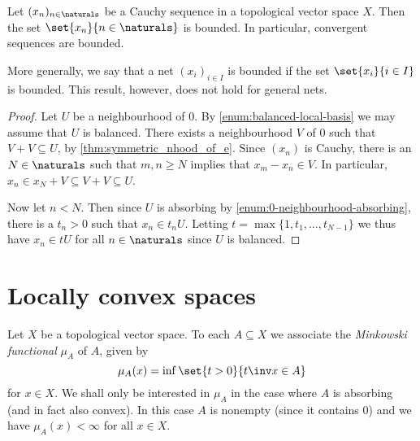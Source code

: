 \documentclass[article, a4paper, 11pt, oneside]{memoir}
\numberwithin{equation}{chapter}
\begin{document}
\begin{corollary}
    \label{thm:Cauchy-sequence-bounded}
    Let $(x_n)_{n \in \naturals}$ be a Cauchy sequence in a topological vector space $X$. Then the set $\set{x_n}{n \in \naturals}$ is bounded. In particular, convergent sequences are bounded.
\end{corollary}
%
More generally, we say that a net $(x_i)_{i \in I}$ is bounded if the set $\set{x_i}{i \in I}$ is bounded. This result, however, does not hold for general nets.

\begin{proof}
    Let $U$ be a neighbourhood of $0$. By \cref{enum:balanced-local-basis} we may assume that $U$ is balanced. There exists a neighbourhood $V$ of $0$ such that $V + V \subseteq U$, by \cref{thm:symmetric_nhood_of_e}. Since $(x_n)$ is Cauchy, there is an $N \in \naturals$ such that $m,n \geq N$ implies that $x_m - x_n \in V$. In particular, $x_n \in x_N + V \subseteq V + V \subseteq U$.

    Now let $n < N$. Then since $U$ is absorbing by \cref{enum:0-neighbourhood-absorbing}, there is a $t_n > 0$ such that $x_n \in t_n U$. Letting $t = \max\{1, t_1, \ldots, t_{N-1}\}$ we thus have $x_n \in tU$ for all $n \in \naturals$ since $U$ is balanced.
\end{proof}


\section{Locally convex spaces}

Let $X$ be a topological vector space. To each $A \subseteq X$ we associate the \emph{Minkowski functional} $\mu_A$ of $A$, given by
%
\begin{equation*}
    \mu_A(x)
        = \inf \set{t > 0}{t\inv x \in A}
\end{equation*}
%
for $x \in X$. We shall only be interested in $\mu_A$ in the case where $A$ is absorbing (and in fact also convex). In this case $A$ is nonempty (since it contains $0$) and we have $\mu_A(x) < \infty$ for all $x \in X$.
\end{document}
